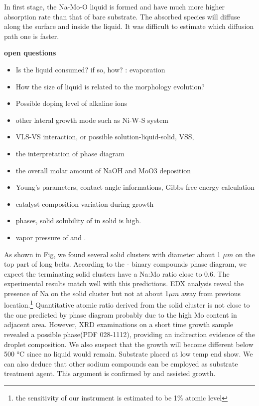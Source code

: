 In first stage, the Na-Mo-O liquid is formed and have much more higher absorption rate than that of bare substrate. The absorbed species will diffuse along the surface and inside the liquid. It was difficult to estimate which diffusion path one is faster. 


\textbf{open questions}
\begin{itemize}
\item Is the liquid consumed? if so, how? : evaporation
\item How the size of liquid is related to the morphology evolution?
\item Possible doping level of alkaline ions
\item other lateral growth mode such as Ni-W-S system
\item VLS-VS interaction, or possible solution-liquid-solid, VSS,
\item the interpretation of phase diagram
\item the overall molar amount of NaOH and MoO3 deposition
\item Young's parameters, contact angle informations, Gibbs free energy calculation
\item catalyst composition variation during growth
\item {} phases, solid solubility of  in solid  is high.
\item vapor pressure of  and .
\end{itemize}


As shown in Fig, we found several solid clusters with diameter about 1 $\mu m$ on the top part of long belts. According to the - binary compounds phase diagram, we expect the terminating solid clusters have a Na:Mo ratio close to 0.6. The experimental results match well with this predictions. EDX analysis reveal the presence of Na on the solid cluster but not at about 1$\mu m$ away from previous location.\footnote{the sensitivity of our instrument is estimated to be 1\% atomic level} Quantitative atomic ratio derived from the solid cluster is not close to the one predicted by phase diagram probably due to the high Mo content in adjacent area. However, XRD examinations on a short time growth sample revealed a possible  phase(PDF 028-1112), providing an indirection evidence of the droplet composition. We also suspect that the growth will become different below 500 \si{\degreeCelsius} since no liquid would remain. Substrate placed at low temp end show.
We can also deduce that other sodium compounds can be employed as substrate treatment agent. This argument is confirmed by  and  assisted growth.


